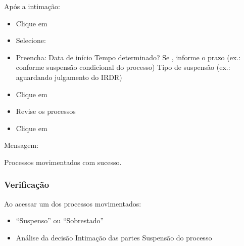 \documentclass[letterpaper,10pt,brazil]{sphinxmanual}
\begin{document}
\sphinxAtStartPar
{}

\sphinxAtStartPar
Após a intimação:
\begin{itemize}
\item {} 
\sphinxAtStartPar
Clique em 

\item {} 
\sphinxAtStartPar
Selecione: 

\item {} 
\sphinxAtStartPar
Preencha:
\sphinxhyphen{} Data de início
\sphinxhyphen{} Tempo determinado? Se , informe o prazo (ex.: conforme suspensão condicional do processo)
\sphinxhyphen{} Tipo de suspensão (ex.: aguardando julgamento do IRDR)

\item {} 
\sphinxAtStartPar
Clique em 

\item {} 
\sphinxAtStartPar
Revise os processos

\item {} 
\sphinxAtStartPar
Clique em 

\end{itemize}

\sphinxAtStartPar
Mensagem:

\sphinxAtStartPar
Processos movimentados com sucesso.


\subsubsection{Verificação}
\label{\detokenize{projud_08_multiplaeunitariamov:verificacao}}
\sphinxAtStartPar
Ao acessar um dos processos movimentados:
\begin{itemize}
\item {} 
\sphinxAtStartPar
{} “Suspenso” ou “Sobrestado”

\item {} 
\sphinxAtStartPar
{}
\sphinxhyphen{} Análise da decisão
\sphinxhyphen{} Intimação das partes
\sphinxhyphen{} Suspensão do processo

\end{itemize}
\end{document}
